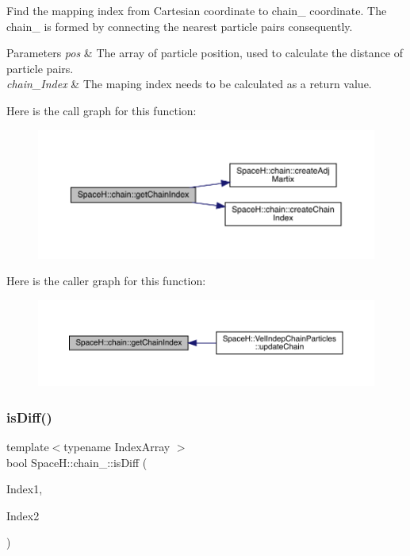 Find the mapping index from Cartesian coordinate to chain_ coordinate. The chain_ is formed by connecting the nearest particle pairs consequently.
\begin{DoxyParams}{Parameters}
{\em pos} & The array of particle position, used to calculate the distance of particle pairs. \\
\hline
{\em chain_\+Index} & The maping index needs to be calculated as a return value. \\
\hline
\end{DoxyParams}
Here is the call graph for this function\+:\nopagebreak
\begin{figure}[H]
\begin{center}
\leavevmode
\includegraphics[width=350pt]{namespace_space_h_1_1chain_a9f1ed51f097bc8cf691a87b97639dde9_cgraph}
\end{center}
\end{figure}
Here is the caller graph for this function\+:
\nopagebreak
\begin{figure}[H]
\begin{center}
\leavevmode
\includegraphics[width=350pt]{namespace_space_h_1_1chain_a9f1ed51f097bc8cf691a87b97639dde9_icgraph}
\end{center}
\end{figure}
\mbox{\label{namespace_space_h_1_1chain_ab54ce920a542c01625ee7d6c625cc5c4}} 
\subsubsection{\texorpdfstring{is\+Diff()}{isDiff()}}
{\footnotesize\ttfamily template$<$typename Index\+Array $>$ \\
bool Space\+H\+::chain_\+::is\+Diff (\begin{DoxyParamCaption}\item[{const Index\+Array \&}]{Index1,  }\item[{const Index\+Array \&}]{Index2 }\end{DoxyParamCaption})}



